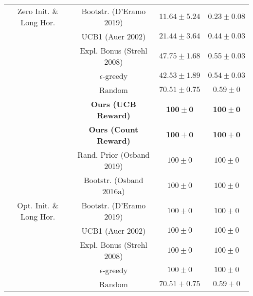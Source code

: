 \documentclass{article}
\begin{document}
\begin{table}[h]
\begin{tabular}{ c | c | c c }
 Zero Init. \& Long Hor. & Bootstr. (D'Eramo 2019) & $11.64 \pm 5.24$ & $0.23 \pm 0.08$ \\
 & UCB1 (Auer 2002) & $21.44 \pm 3.64$ & $0.44 \pm 0.03$ \\
 & Expl. Bonus (Strehl 2008) & $47.75 \pm 1.68$ & $0.55 \pm 0.03$ \\
 & $\epsilon$-greedy & $42.53 \pm 1.89$ & $0.54 \pm 0.03$ \\
 & Random & $70.51 \pm 0.75$ & $0.59 \pm 0$ \\
 \hline
 & \textbf{Ours (UCB Reward)} & $\mathbf{100 \pm 0}$ & $\mathbf{100 \pm 0}$ \\
 & \textbf{Ours (Count Reward)} & $\mathbf{100 \pm 0}$ & $\mathbf{100 \pm 0}$ \\
 & Rand. Prior (Osband 2019) & $100 \pm 0$ & $100 \pm 0$ \\
 & Bootstr. (Osband 2016a) & $100 \pm 0$ & $100 \pm 0$ \\
 Opt. Init. \& Long Hor. & Bootstr. (D'Eramo 2019) & $100 \pm 0$ & $100 \pm 0$ \\
 & UCB1 (Auer 2002) & $100 \pm 0$ & $100 \pm 0$ \\
 & Expl. Bonus (Strehl 2008) & $100 \pm 0$ & $100 \pm 0$ \\
 & $\epsilon$-greedy & $100 \pm 0$ & $100 \pm 0$ \\
 & Random & $70.51 \pm 0.75$ & $0.59 \pm 0$ \\
 \end{tabular}
\end{table}

 
\end{document}
